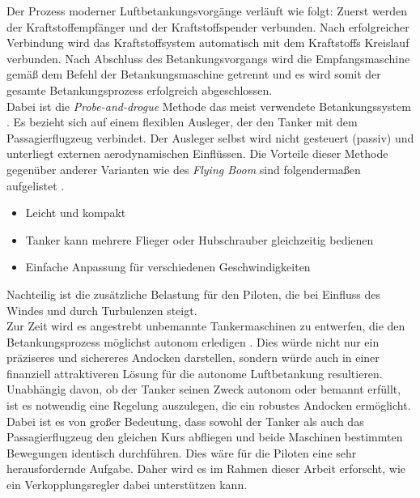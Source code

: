 Der Prozess moderner Luftbetankungsvorgänge verläuft wie folgt: Zuerst werden der Kraftstoffempfänger und der Kraftstoffspender verbunden. Nach erfolgreicher Verbindung wird das Kraftstoffsystem  automatisch mit dem Kraftstoffs Kreislauf verbunden. Nach Abschluss des Betankungsvorgangs wird die Empfangsmaschine gemäß dem Befehl der Betankungsmaschine getrennt und es wird somit der gesamte Betankungsprozess erfolgreich abgeschlossen.\\
Dabei ist die \textit{Probe-and-drogue} Methode das meist verwendete Betankungssystem \cite{Methoden}. Es bezieht sich auf einem flexiblen Ausleger, der den Tanker mit dem Passagierflugzeug verbindet. Der Ausleger selbst wird nicht gesteuert (passiv) und unterliegt externen aerodynamischen Einflüssen. Die Vorteile dieser Methode gegenüber anderer Varianten wie des \textit{Flying Boom} sind folgendermaßen aufgelistet \cite{Methoden}.
\begin{itemize}
    \item Leicht und kompakt
    \item Tanker kann mehrere Flieger oder Hubschrauber gleichzeitig bedienen
    \item Einfache Anpassung für verschiedenen Geschwindigkeiten 
\end{itemize}
Nachteilig ist die zusätzliche Belastung für den Piloten, die bei Einfluss des Windes und durch Turbulenzen steigt.\\ 
Zur Zeit wird es angestrebt unbemannte Tankermaschinen zu entwerfen, die den Betankungsprozess möglichst autonom erledigen \cite{Autonom1,Autonom2}. Dies würde nicht nur ein präziseres und sichereres Andocken darstellen, sondern würde auch in einer finanziell attraktiveren Lösung für die autonome Luftbetankung resultieren.\\
Unabhängig davon, ob der Tanker seinen Zweck autonom oder bemannt erfüllt, ist es notwendig eine Regelung auszulegen, die ein robustes Andocken ermöglicht. Dabei ist es von großer Bedeutung, dass sowohl der Tanker als auch das Passagierflugzeug den gleichen Kurs abfliegen und beide Maschinen bestimmten Bewegungen identisch durchführen. Dies wäre für die Piloten eine sehr herausfordernde Aufgabe. Daher wird es im Rahmen dieser Arbeit erforscht, wie ein Verkopplungsregler dabei unterstützen kann. 
